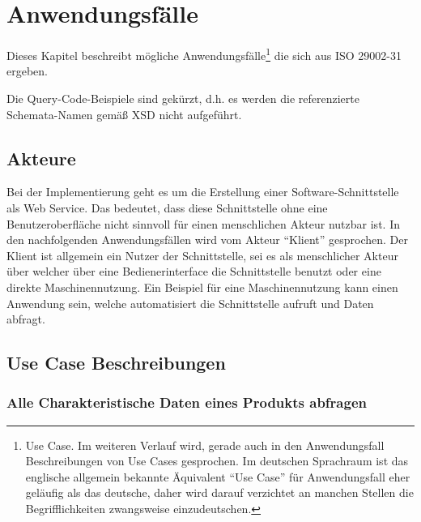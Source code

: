 \section{Anwendungsfälle}\label{kap:Use_Cases}

Dieses Kapitel beschreibt mögliche Anwendungsfälle\footnote{Use Case. Im weiteren Verlauf wird, gerade auch in den Anwendungsfall Beschreibungen von Use Cases gesprochen. Im deutschen Sprachraum ist das englische allgemein bekannte Äquivalent \enquote{Use Case} für Anwendungsfall eher geläufig als das deutsche, daher wird darauf verzichtet an manchen Stellen die Begrifflichkeiten zwangsweise einzudeutschen.} die sich aus ISO 29002-31 ergeben. 


Die Query-Code-Beispiele sind gekürzt, d.h. es werden die referenzierte Schemata-Namen gemäß XSD nicht aufgeführt. 


\subsection{Akteure}
Bei der Implementierung geht es um die Erstellung einer Software-Schnittstelle als Web Service. Das bedeutet, dass diese Schnittstelle ohne eine Benutzeroberfläche nicht sinnvoll für einen menschlichen Akteur nutzbar ist. In den nachfolgenden Anwendungsfällen wird vom Akteur \enquote{Klient} gesprochen. Der Klient ist allgemein ein Nutzer der Schnittstelle, sei es als menschlicher Akteur über welcher über eine Bedienerinterface die Schnittstelle benutzt oder eine direkte Maschinennutzung. Ein Beispiel für eine Maschinennutzung kann einen Anwendung sein, welche automatisiert die Schnittstelle aufruft und Daten abfragt.    


\subsection{Use Case Beschreibungen}

\subsubsection{Alle Charakteristische Daten eines Produkts abfragen}

